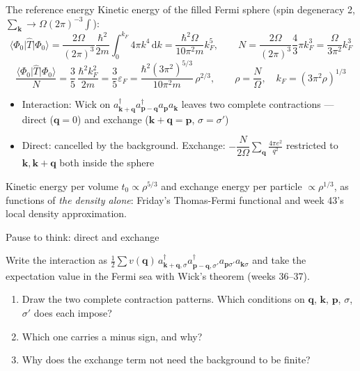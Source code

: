 \documentclass[aspectratio=169,10pt]{beamer}
\newcounter{thinkctr}
\newcommand{\thinkq}[2]{%
  \stepcounter{thinkctr}%
  \vfill
  \begin{tcolorbox}[enhanced,colback=palewarm,colframe=warm,boxrule=1.2pt,arc=4pt,
    grow to left by=6mm,grow to right by=6mm,
    left=16pt,right=16pt,top=16pt,bottom=18pt,
    fonttitle=\bfseries\Large,fontupper=\Large,
    title={Pause to think \#\thethinkctr\hfill\mdseries\normalsize(about #1 min -- discuss with your neighbour)}]
  #2
  \end{tcolorbox}
  \vfill}
\newcommand{\element}[3]{\langle #1\vert #2\vert #3\rangle}
\newcommand{\ad}[1]{a_{#1}^{\dagger}}
\newcommand{\dd}{\mathrm{d}}
\newcommand{\dftbox}[1]{%
  \begin{tcolorbox}[colback=paleteal,colframe=teal,title={\bfseries Density functional connection}]
  #1
  \end{tcolorbox}}
\begin{document}
\begin{frame}[shrink=3]{The reference energy}
  \small
  Kinetic energy of the filled Fermi sphere (spin degeneracy 2, $\sum_{\bm k}\to\Omega(2\pi)^{-3}\int$):
  \[
    \element{\Phi_0}{\hat T}{\Phi_0}=\frac{2\Omega}{(2\pi)^3}\frac{\hbar^2}{2m}\int_0^{k_F}4\pi k^4\,\dd k=\frac{\hbar^2\Omega}{10\pi^2m}k_F^5,
    \qquad
    N=\frac{2\Omega}{(2\pi)^3}\frac43\pi k_F^3=\frac{\Omega}{3\pi^2}k_F^3
  \]
  \[
    \boxed{\;\frac{\element{\Phi_0}{\hat T}{\Phi_0}}{N}=\frac35\,\frac{\hbar^2k_F^2}{2m}=\frac35\varepsilon_F
    =\frac{\hbar^2(3\pi^2)^{5/3}}{10\pi^2m}\,\rho^{2/3},\qquad \rho=\frac N\Omega,\quad k_F=(3\pi^2\rho)^{1/3}\;}
  \]
  \begin{itemize}
    \item Interaction: Wick on $\ad{\bm k+\bm q}\ad{\bm p-\bm q}a_{\bm p}a_{\bm k}$ leaves two complete contractions --- direct ($\bm q=0$) and exchange ($\bm k+\bm q=\bm p$, $\sigma=\sigma'$)
    \item Direct: cancelled by the background. Exchange: $-\dfrac{N}{2\Omega}\displaystyle\sum_{\bm q}\frac{4\pi e^2}{q^2}$ restricted to $\bm k,\bm k+\bm q$ both inside the sphere
  \end{itemize}
  \dftbox{Kinetic energy per volume $t_0\propto\rho^{5/3}$ and exchange energy per particle $\propto\rho^{1/3}$, as functions of \emph{the density alone}: Friday's Thomas-Fermi functional and week 43's local density approximation.}
\end{frame}

\begin{frame}{Pause to think: direct and exchange}
  \thinkq{3}{
  Write the interaction as $\frac12\sum v(\bm q)\,\ad{\bm k+\bm q,\sigma}\ad{\bm p-\bm q,\sigma'}a_{\bm p\sigma'}a_{\bm k\sigma}$ and take the expectation value in the Fermi sea with Wick's theorem (weeks 36--37).
  \begin{enumerate}
    \item Draw the two complete contraction patterns. Which conditions on $\bm q$, $\bm k$, $\bm p$, $\sigma$, $\sigma'$ does each impose?
    \item Which one carries a minus sign, and why?
    \item Why does the exchange term not need the background to be finite?
  \end{enumerate}}
\end{frame}
\end{document}
